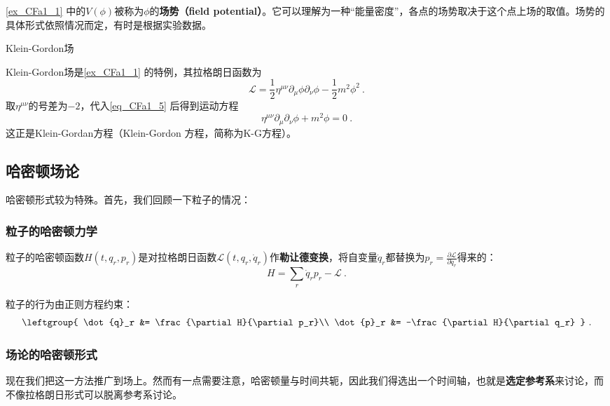 \autoref{ex_CFa1_1} 中的$V(\phi)$被称为$\phi$的\textbf{场势（field potential）}。它可以理解为一种“能量密度”，各点的场势取决于这个点上场的取值。场势的具体形式依照情况而定，有时是根据实验数据。



\begin{example}{Klein-Gordon场}

Klein-Gordon场是\autoref{ex_CFa1_1} 的特例，其拉格朗日函数为
\begin{equation}
\mathcal{L} = \frac{1}{2}\eta^{\mu\nu}\partial_\mu\phi\partial_\nu\phi - \frac{1}{2}m^2\phi^2~.
\end{equation}
取$\eta^{\mu\nu}$的号差为$-2$，代入\autoref{eq_CFa1_5} 后得到运动方程
\begin{equation}
\eta^{\mu\nu}\partial_\mu\partial_\nu\phi + m^2\phi = 0
 ~.
\end{equation}
这正是Klein-Gordan方程（Klein-Gordon 方程，简称为K-G方程）。


\end{example}




\subsection{哈密顿场论}

哈密顿形式较为特殊。首先，我们回顾一下粒子的情况：

\subsubsection{粒子的哈密顿力学}

粒子的哈密顿函数$H(t, q_r, p_r)$是对拉格朗日函数$\mathcal{L}(t, q_r, \dot{q}_r)$作\textbf{勒让德变换}，将自变量$\dot{q}_r$都替换为$p_r=\frac{\partial \mathcal{L}}{\partial \dot{q}_r}$得来的：
\begin{equation}
H = \sum_r \dot{q}_rp_r-\mathcal{L}~.
\end{equation}

粒子的行为由正则方程约束：
\begin{equation}
\leftgroup{
    \dot{q}_r &= \frac{\partial H}{\partial p_r}\\
    \dot{p}_r &= -\frac{\partial H}{\partial q_r}
}~.
\end{equation}



\subsubsection{场论的哈密顿形式}


现在我们把这一方法推广到场上。然而有一点需要注意，哈密顿量与时间共轭，因此我们得选出一个时间轴，也就是\textbf{选定参考系}来讨论，而不像拉格朗日形式可以脱离参考系讨论。




















